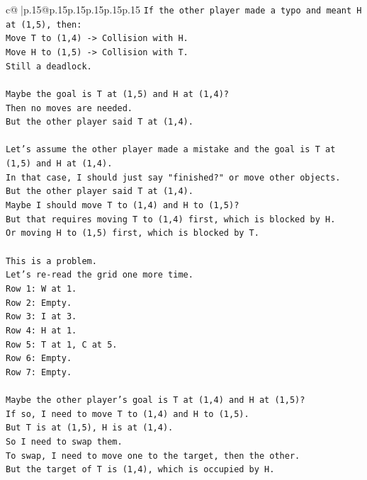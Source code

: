 \documentclass{article}
\begin{document}
{\begin{supertabular}{c@{$\;$}|p{.15\linewidth}@{}p{.15\linewidth}p{.15\linewidth}p{.15\linewidth}p{.15\linewidth}p{.15\linewidth}}
{{{\texttt{If the other player made a typo and meant H at (1,5), then:} \\
\texttt{Move T to (1,4) {-}> Collision with H.} \\
\texttt{Move H to (1,5) {-}> Collision with T.} \\
\texttt{Still a deadlock.} \\
\\ 
\texttt{Maybe the goal is T at (1,5) and H at (1,4)?} \\
\texttt{Then no moves are needed.} \\
\texttt{But the other player said T at (1,4).} \\
\\ 
\texttt{Let's assume the other player made a mistake and the goal is T at (1,5) and H at (1,4).} \\
\texttt{In that case, I should just say "finished?" or move other objects.} \\
\texttt{But the other player said T at (1,4).} \\
\texttt{Maybe I should move T to (1,4) and H to (1,5)?} \\
\texttt{But that requires moving T to (1,4) first, which is blocked by H.} \\
\texttt{Or moving H to (1,5) first, which is blocked by T.} \\
\\ 
\texttt{This is a problem.} \\
\texttt{Let's re{-}read the grid one more time.} \\
\texttt{Row 1: W at 1.} \\
\texttt{Row 2: Empty.} \\
\texttt{Row 3: I at 3.} \\
\texttt{Row 4: H at 1.} \\
\texttt{Row 5: T at 1, C at 5.} \\
\texttt{Row 6: Empty.} \\
\texttt{Row 7: Empty.} \\
\\ 
\texttt{Maybe the other player's goal is T at (1,4) and H at (1,5)?} \\
\texttt{If so, I need to move T to (1,4) and H to (1,5).} \\
\texttt{But T is at (1,5), H is at (1,4).} \\
\texttt{So I need to swap them.} \\
\texttt{To swap, I need to move one to the target, then the other.} \\
\texttt{But the target of T is (1,4), which is occupied by H.} \\
}}}
\end{supertabular}}
\end{document}
